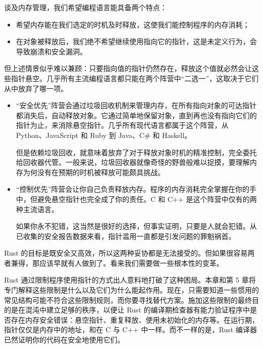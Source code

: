 
谈及内存管理，我们希望编程语言能具备两个特点：

\begin{itemize}
\item 希望内存能在我们选定的时机及时释放，这使我们能控制程序的内存消耗；
\item 在对象被释放后，我们绝不希望继续使用指向它的指针，这是未定义行为，会导致崩溃和安全漏洞。
\end{itemize}

但上述情景似乎难以兼顾：只要指向值的指针仍然存在，释放这个值就必然会让这些指针悬空。几乎所有主流编程语言都只能在两个阵营中“二选一”，这取决于它们从中放弃了哪一项。

\begin{itemize}
\item “安全优先”阵营会通过垃圾回收机制来管理内存，在所有指向对象的可达指针都消失后，自动释放对象。它通过简单地保留对象，直到再也没有指向它们的指针为止，来消除悬空指针。几乎所有现代语言都属于这个阵营，从 Python、JavaScript 和 Ruby 到 Java、C\# 和 Haskell。

但是依赖垃圾回收，就意味着放弃了对于释放对象时机的精准控制，完全委托给回收器代管。一般来说，垃圾回收器就像奇怪的野兽般难以捉摸，要理解内存为何没有在预期的时机被释放可能颇具挑战。
\item “控制优先”阵营会让你自己负责释放内存。程序的内存消耗完全掌握在你的手中，但避免悬空指针也完全成了你的责任。C 和 C++ 是这个阵营中仅有的两种主流语言。

如果你永不犯错，这当然是很好的选择，但事实证明，只要是人就会犯错。从已收集的安全报告数据来看，指针滥用一直都是引发问题的罪魁祸首。
\end{itemize}

Rust 的目标是既安全又高效，所以这两种妥协都是无法接受的。但如果很容易两者兼得，那应该早就有人做到了。看来我们需要做一些根本性的变革。

Rust 通过限制程序使用指针的方式出人意料地打破了这种困局。本章和第 5 章将专门解释这些限制是什么以及它们为什么能起作用。现在，只需要知道一些惯用的常见结构可能不符合这些限制规则，而你要寻找替代方案。施加这些限制的最终目的是在混沌中建立足够的秩序，以便让 Rust 的编译期检查器有能力验证程序中是否存在内存安全错误：悬空指针、重复释放、使用未初始化的内存等。在运行期，指针仅仅是内存中的地址，和在 C 与 C++ 中一样。而不一样的是，Rust 编译器已然证明你的代码在安全地使用它们。

